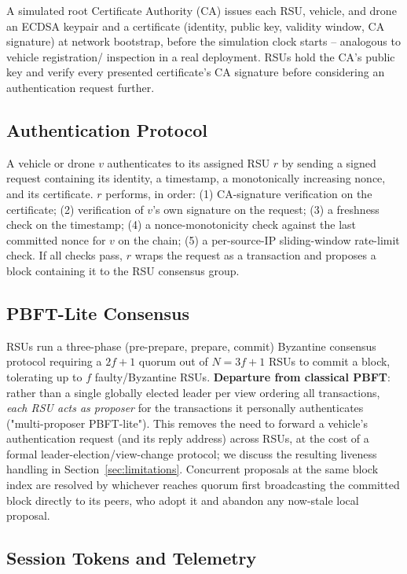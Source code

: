 \documentclass[conference]{IEEEtran}
\begin{document}
A simulated root Certificate Authority (CA) issues each RSU, vehicle,
and drone an ECDSA keypair and a certificate (identity, public key,
validity window, CA signature) at network bootstrap, before the
simulation clock starts -- analogous to vehicle registration/
inspection in a real deployment. RSUs hold the CA's public key and
verify every presented certificate's CA signature before considering
an authentication request further.

\subsection{Authentication Protocol}

A vehicle or drone $v$ authenticates to its assigned RSU $r$ by
sending a signed request containing its identity, a timestamp, a
monotonically increasing nonce, and its certificate. $r$ performs, in
order: (1) CA-signature verification on the certificate; (2)
verification of $v$'s own signature on the request; (3) a freshness
check on the timestamp; (4) a nonce-monotonicity check against the
last committed nonce for $v$ on the chain; (5) a per-source-IP
sliding-window rate-limit check. If all checks pass, $r$ wraps the
request as a transaction and proposes a block containing it to the
RSU consensus group.

\subsection{PBFT-Lite Consensus}
\label{sec:pbft}

RSUs run a three-phase (pre-prepare, prepare, commit) Byzantine
consensus protocol requiring a $2f{+}1$ quorum out of $N = 3f{+}1$
RSUs to commit a block, tolerating up to $f$ faulty/Byzantine RSUs.
\textbf{Departure from classical PBFT}: rather than a single globally
elected leader per view ordering all transactions, \emph{each RSU
acts as proposer} for the transactions it personally authenticates
("multi-proposer PBFT-lite"). This removes the need to forward a
vehicle's authentication request (and its reply address) across RSUs,
at the cost of a formal leader-election/view-change protocol; we
discuss the resulting liveness handling in
Section~\ref{sec:limitations}. Concurrent proposals at the same block
index are resolved by whichever reaches quorum first broadcasting the
committed block directly to its peers, who adopt it and abandon any
now-stale local proposal.

\subsection{Session Tokens and Telemetry}
\end{document}
